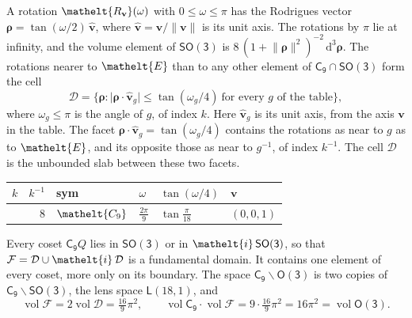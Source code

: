 \documentclass[10pt,a4paper]{article}
\numberwithin{equation}{section}
\newcommand{\eltfont}[1]{{\let\sigma\eltsigma\mathelt{#1}}}
\newcommand{\grp}[1]{\mathsf{#1}}
\newcommand{\cls}[1]{\eltfont{#1}}
\newcommand{\elt}[1]{\eltfont{#1}}
\newcommand{\dirvec}[3]{(#1, #2, #3)}
\newcommand{\unitaxis}{\hat{\mathbf{v}}}
\newcommand{\vv}{\mathbf{v}}
\newcommand{\diff}{\mathrm{d}}
\newcommand{\vol}{\operatorname{vol}}
\newcommand{\rodrigues}{\boldsymbol{\rho}}
\newcommand{\fcell}{\mathcal{D}}
\newcommand{\fdomain}{\mathcal{F}}
\newcommand{\lensspace}[2]{\mathsf{L}(#1, #2)}
\begin{document}
\leavevmode\label{n:vector.rodrigues}\label{n:vector.unitaxis}A rotation $\elt{R_{\vv}}(\omega)$ with $0 \le \omega \le \pi$ has the Rodrigues vector $\rodrigues = \tan(\omega/2)\,\unitaxis$, where $\unitaxis = \vv/\lVert\vv\rVert$ is its unit axis. The rotations by $\pi$ lie at infinity, and the volume element of \href{SO3.pdf}{$\grp{SO(3)}$} is $8\,(1 + \lVert\rodrigues\rVert^2)^{-2}\,\diff^3\rodrigues$.
\leavevmode\label{n:set.cell}The rotations nearer to $\elt{E}$ than to any other element of $\grp{C_{9}} \cap \grp{SO(3)}$ form the cell
\begin{equation}\label{e:cell}\fcell = \bigl\{\rodrigues : \lvert\rodrigues\cdot\unitaxis_g\rvert \le \tan(\omega_g/4)\ \text{for every $g$ of the table}\bigr\},\end{equation}
where $\omega_g \le \pi$ is the angle of $g$, of index $k$. Here $\unitaxis_g$ is its unit axis, from the axis $\vv$ in the table. The facet $\rodrigues\cdot\unitaxis_g = \tan(\omega_g/4)$ contains the rotations as near to $g$ as to $\elt{E}$, and its opposite those as near to $g^{-1}$, of index $k^{-1}$. The cell $\fcell$ is the unbounded slab between these two facets.
{\small{\renewcommand{\arraystretch}{1.3}\begin{longtable}{@{}rrllll@{}}\toprule
$k$ & $k^{-1}$ & sym & $\omega$ & $\tan(\omega/4)$ & $\vv$\\\midrule\endhead
\bottomrule\endfoot\endlastfoot
1 & 8 & $\cls{C_{9}}$ & $\tfrac{2\pi}{9}$ & $\tan\tfrac{\pi}{18}$ & $\dirvec{0}{0}{1}$\\
\bottomrule\end{longtable}}}

\leavevmode\label{n:set.fundamental}Every coset $\grp{C_{9}}Q$ lies in \href{SO3.pdf}{$\grp{SO(3)}$} or in $\elt{i}\,\grp{SO(3)}$, so that $\fdomain = \fcell \cup \elt{i}\,\fcell$ is a fundamental domain. It contains one element of every coset, more only on its boundary.
\leavevmode\label{n:set.lens}The space $\grp{C_{9}}\backslash\grp{O(3)}$ is two copies of $\grp{C_{9}}\backslash\grp{SO(3)}$, the lens space $\lensspace{18}{1}$, and
\begin{equation}\label{e:volume}\vol\fdomain = 2\vol\fcell = \tfrac{16}{9}\pi^2,\qquad \vol\grp{C_{9}}\cdot\vol\fdomain = 9\cdot \tfrac{16}{9}\pi^2 = 16\pi^2 = \vol\grp{O(3)}.\end{equation}
\end{document}
